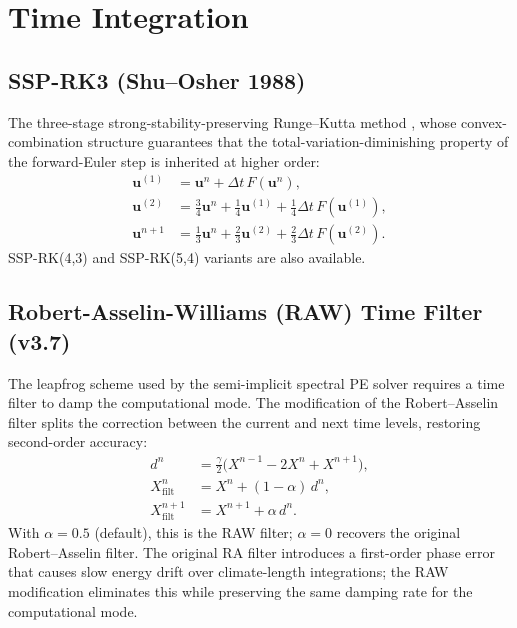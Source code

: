 \documentclass[11pt,a4paper]{article}
\begin{document}
\section{Time Integration}

\subsection{SSP-RK3 (Shu--Osher 1988)}

The three-stage strong-stability-preserving Runge--Kutta method \citep{ShuOsher1988}, whose convex-combination structure guarantees that the total-variation-diminishing property of the forward-Euler step is inherited at higher order:
\begin{align}
  \bm u^{(1)} &= \bm u^n + \Delta t\,F(\bm u^n), \\
  \bm u^{(2)} &= \tfrac{3}{4}\bm u^n + \tfrac{1}{4}\bm u^{(1)} + \tfrac{1}{4}\Delta t\,F(\bm u^{(1)}), \\
  \bm u^{n+1} &= \tfrac{1}{3}\bm u^n + \tfrac{2}{3}\bm u^{(2)} + \tfrac{2}{3}\Delta t\,F(\bm u^{(2)}).
\end{align}
SSP-RK(4,3) and SSP-RK(5,4) variants are also available.

\subsection{Robert-Asselin-Williams (RAW) Time Filter (v3.7)}

The leapfrog scheme used by the semi-implicit spectral PE solver requires a time filter to damp the computational mode.  The \citet{Williams2009} modification of the Robert--Asselin filter splits the correction between the current and next time levels, restoring second-order accuracy:
\begin{align}
  d^n &= \frac{\gamma}{2}\bigl(X^{n-1}-2X^n+X^{n+1}\bigr), \\
  X^n_{\mathrm{filt}} &= X^n + (1-\alpha)\,d^n, \\
  X^{n+1}_{\mathrm{filt}} &= X^{n+1} + \alpha\,d^n.
\end{align}
With $\alpha=0.5$ (default), this is the RAW filter; $\alpha=0$ recovers the original Robert--Asselin filter.  The original RA filter introduces a first-order phase error that causes slow energy drift over climate-length integrations; the RAW modification eliminates this while preserving the same damping rate for the computational mode.
\end{document}
